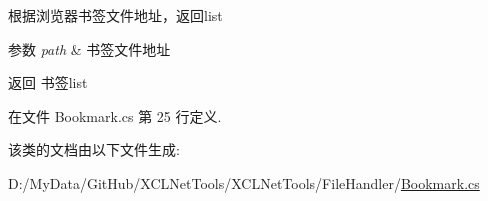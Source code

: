 根据浏览器书签文件地址，返回list 


\begin{DoxyParams}{参数}
{\em path} & 书签文件地址\\
\hline
\end{DoxyParams}
\begin{DoxyReturn}{返回}
书签list
\end{DoxyReturn}


在文件 Bookmark.\+cs 第 25 行定义.



该类的文档由以下文件生成\+:\begin{DoxyCompactItemize}
\item 
D\+:/\+My\+Data/\+Git\+Hub/\+X\+C\+L\+Net\+Tools/\+X\+C\+L\+Net\+Tools/\+File\+Handler/\hyperlink{_bookmark_8cs}{Bookmark.\+cs}\end{DoxyCompactItemize}
